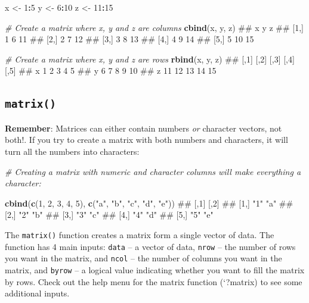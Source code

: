 \documentclass[]{book}
\newenvironment{Shaded}{\begin{snugshade}}{\end{snugshade}}
\newcommand{\KeywordTok}[1]{\textcolor[rgb]{0.13,0.29,0.53}{\textbf{#1}}}
\newcommand{\DecValTok}[1]{\textcolor[rgb]{0.00,0.00,0.81}{#1}}
\newcommand{\StringTok}[1]{\textcolor[rgb]{0.31,0.60,0.02}{#1}}
\newcommand{\CommentTok}[1]{\textcolor[rgb]{0.56,0.35,0.01}{\textit{#1}}}
\newcommand{\OperatorTok}[1]{\textcolor[rgb]{0.81,0.36,0.00}{\textbf{#1}}}
\newcommand{\NormalTok}[1]{#1}
\theoremstyle{definition}
\theoremstyle{definition}
\theoremstyle{remark}
\begin{document}
\begin{Shaded}
\begin{Highlighting}[]
\NormalTok{x <-}\StringTok{ }\DecValTok{1}\OperatorTok{:}\DecValTok{5}
\NormalTok{y <-}\StringTok{ }\DecValTok{6}\OperatorTok{:}\DecValTok{10}
\NormalTok{z <-}\StringTok{ }\DecValTok{11}\OperatorTok{:}\DecValTok{15}

\CommentTok{# Create a matrix where x, y and z are columns}
\KeywordTok{cbind}\NormalTok{(x, y, z)}
\NormalTok{##      x  y  z}
\NormalTok{## [1,] 1  6 11}
\NormalTok{## [2,] 2  7 12}
\NormalTok{## [3,] 3  8 13}
\NormalTok{## [4,] 4  9 14}
\NormalTok{## [5,] 5 10 15}

\CommentTok{# Create a matrix where x, y and z are rows}
\KeywordTok{rbind}\NormalTok{(x, y, z)}
\NormalTok{##   [,1] [,2] [,3] [,4] [,5]}
\NormalTok{## x    1    2    3    4    5}
\NormalTok{## y    6    7    8    9   10}
\NormalTok{## z   11   12   13   14   15}
\end{Highlighting}
\end{Shaded}

\subsection{\texorpdfstring{\texttt{matrix()}}{matrix()}}\label{matrix}

\textbf{Remember}: Matrices can either contain numbers \emph{or}
character vectors, not both!. If you try to create a matrix with both
numbers and characters, it will turn all the numbers into characters:

\begin{Shaded}
\begin{Highlighting}[]
\CommentTok{# Creating a matrix with numeric and character columns will make everything a character:}

\KeywordTok{cbind}\NormalTok{(}\KeywordTok{c}\NormalTok{(}\DecValTok{1}\NormalTok{, }\DecValTok{2}\NormalTok{, }\DecValTok{3}\NormalTok{, }\DecValTok{4}\NormalTok{, }\DecValTok{5}\NormalTok{),}
      \KeywordTok{c}\NormalTok{(}\StringTok{"a"}\NormalTok{, }\StringTok{"b"}\NormalTok{, }\StringTok{"c"}\NormalTok{, }\StringTok{"d"}\NormalTok{, }\StringTok{"e"}\NormalTok{))}
\NormalTok{##      [,1] [,2]}
\NormalTok{## [1,] "1"  "a" }
\NormalTok{## [2,] "2"  "b" }
\NormalTok{## [3,] "3"  "c" }
\NormalTok{## [4,] "4"  "d" }
\NormalTok{## [5,] "5"  "e"}
\end{Highlighting}
\end{Shaded}

The \texttt{matrix()} function creates a matrix form a single vector of
data. The function has 4 main inputs: \texttt{data} -- a vector of data,
\texttt{nrow} -- the number of rows you want in the matrix, and
\texttt{ncol} -- the number of columns you want in the matrix, and
\texttt{byrow} -- a logical value indicating whether you want to fill
the matrix by rows. Check out the help menu for the matrix function
(`?matrix) to see some additional inputs.
\end{document}
